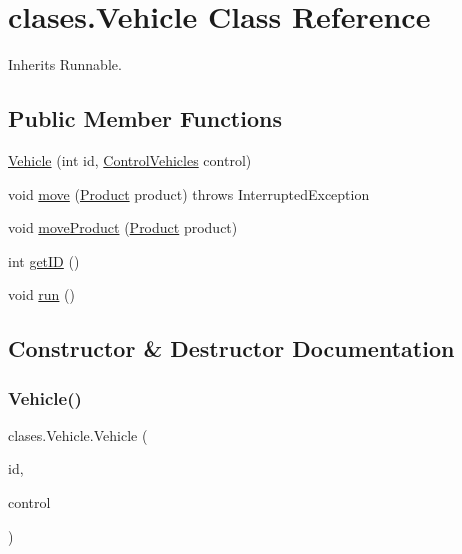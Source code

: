 \hypertarget{classclases_1_1_vehicle}{}\section{clases.\+Vehicle Class Reference}
\label{classclases_1_1_vehicle}


Inherits Runnable.

\subsection*{Public Member Functions}
\begin{DoxyCompactItemize}
\item 
\mbox{\hyperlink{classclases_1_1_vehicle_a81df327dc6c0e7e4aec61774ccf8cd53}{Vehicle}} (int id, \mbox{\hyperlink{classcontrol_1_1_control_vehicles}{Control\+Vehicles}} control)
\item 
void \mbox{\hyperlink{classclases_1_1_vehicle_aed30e6f35ff4a97ba674a512db100480}{move}} (\mbox{\hyperlink{classclases_1_1_product}{Product}} product)  throws Interrupted\+Exception 
\item 
void \mbox{\hyperlink{classclases_1_1_vehicle_a1f34ee065a6e13bb1b2fbbf76f118b9b}{move\+Product}} (\mbox{\hyperlink{classclases_1_1_product}{Product}} product)
\item 
int \mbox{\hyperlink{classclases_1_1_vehicle_aff601a5fcf414d20838a594e6ed2d576}{get\+ID}} ()
\item 
void \mbox{\hyperlink{classclases_1_1_vehicle_a1b1928593230ee67dd07c6023f615fa1}{run}} ()
\end{DoxyCompactItemize}


\subsection{Constructor \& Destructor Documentation}
\mbox{\label{classclases_1_1_vehicle_a81df327dc6c0e7e4aec61774ccf8cd53}} 
\subsubsection{\texorpdfstring{Vehicle()}{Vehicle()}}
{\footnotesize\ttfamily clases.\+Vehicle.\+Vehicle (\begin{DoxyParamCaption}\item[{int}]{id,  }\item[{\mbox{\hyperlink{classcontrol_1_1_control_vehicles}{Control\+Vehicles}}}]{control }\end{DoxyParamCaption})}



